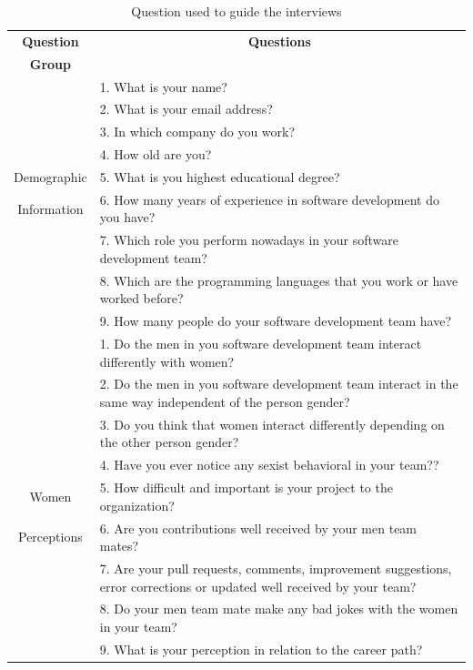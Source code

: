 \documentclass{IEEEcsmag}
\begin{document}
\begin{table}[htpb]
\centering
\caption{Question used to guide the interviews}
    \begin{center} \begin{tabular}{|c|p{13cm}|}
        \hline \textbf{Question} & \multicolumn{1}{c|}{\textbf{Questions}} \\
        \textbf{Group} & \\
         \hline  &  1. What is your name? \\
         & 2. What is your email address? \\
         & 3. In which company do you work?\\
         & 4. How old are you?\\
         Demographic & 5. What is you highest educational degree?\\
         Information & 6. How many years of experience in software development do you have?\\
         & 7. Which role you perform nowadays in your software development team? \\
         & 8. Which are the programming languages that you work or have worked before? \\
         & 9. How many people do your software development team have?\\
         \hline
         & 1. Do the men in you software development team interact differently with women? \\
         & 2. Do the men in you software development team interact in the same way independent of the person gender? \\
         & 3. Do you think that women interact differently depending on the other person gender? \\
         & 4. Have you ever notice any sexist behavioral in your team?? \\ 
         Women & 5. How difficult and important is your project to the organization? \\
         Perceptions & 6. Are you contributions well received by your men team mates? \\
         & 7. Are your pull requests, comments, improvement suggestions, error corrections or updated well received by your team? \\
         & 8. Do your men team mate make any bad jokes with the women in your team? \\
         & 9. What is your perception in relation to the career path? \\

\end{tabular}
\end{center}
\end{table}
\end{document}

